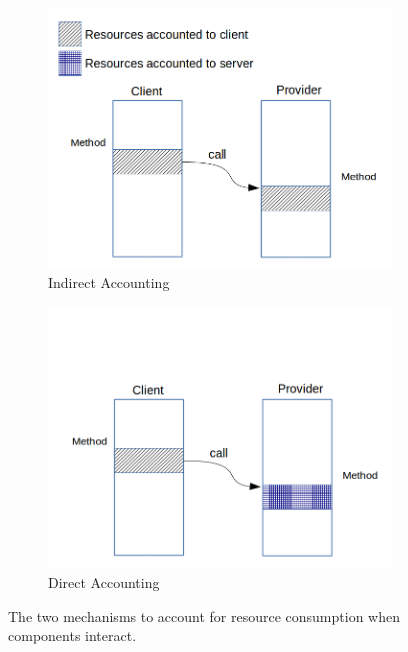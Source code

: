 \begin{figure}[ht]
\begin{subfigure}{0.45\textwidth}
\centering
\includegraphics[scale=0.35]{./chapter2/fig/indirect-accounting.png}
\caption{Indirect Accounting}\label{fig:indirect-accounting}
\end{subfigure}
\hspace{0.6cm}
\begin{subfigure}{0.45\textwidth}
\centering
\includegraphics[scale=0.35]{./chapter2/fig/direct-accounting.png}
\caption{Direct Accounting}\label{fig:direct-accounting}
\end{subfigure}
\caption{The two mechanisms to account for resource consumption when components interact.} \label{fig:accounting-methods}
\end{figure}


